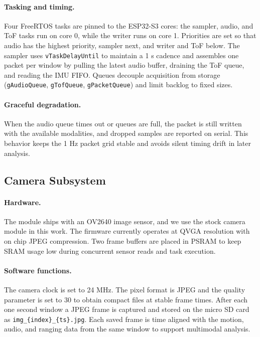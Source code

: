 \documentclass[manuscript,review,anonymous]{acmart}
\begin{document}
\paragraph{Tasking and timing.}
Four FreeRTOS tasks are pinned to the ESP32-S3 cores: the sampler, audio, and ToF tasks run on core 0, while the writer runs on core 1. Priorities are set so that audio has the highest priority, sampler next, and writer and ToF below. The sampler uses \texttt{vTaskDelayUntil} to maintain a 1 s cadence and assembles one packet per window by pulling the latest audio buffer, draining the ToF queue, and reading the IMU FIFO. Queues decouple acquisition from storage (\texttt{gAudioQueue}, \texttt{gTofQueue}, \texttt{gPacketQueue}) and limit backlog to fixed sizes.

\paragraph{Graceful degradation.}
When the audio queue times out or queues are full, the packet is still written with the available modalities, and dropped samples are reported on serial. This behavior keeps the 1 Hz packet grid stable and avoids silent timing drift in later analysis.


\subsection{Camera Subsystem}
\paragraph{Hardware.}
The module ships with an OV2640 image sensor, and we use the stock camera module in this work. The firmware currently operates at QVGA resolution with on chip JPEG compression. Two frame buffers are placed in PSRAM to keep SRAM usage low during concurrent sensor reads and task execution.

\paragraph{Software functions.}
The camera clock is set to 24 MHz. The pixel format is JPEG and the quality parameter is set to 30 to obtain compact files at stable frame times. After each one second window a JPEG frame is captured and stored on the micro SD card as \texttt{img\_\{index\}\_\{ts\}.jpg}. Each saved frame is time aligned with the motion, audio, and ranging data from the same window to support multimodal analysis.
\end{document}
